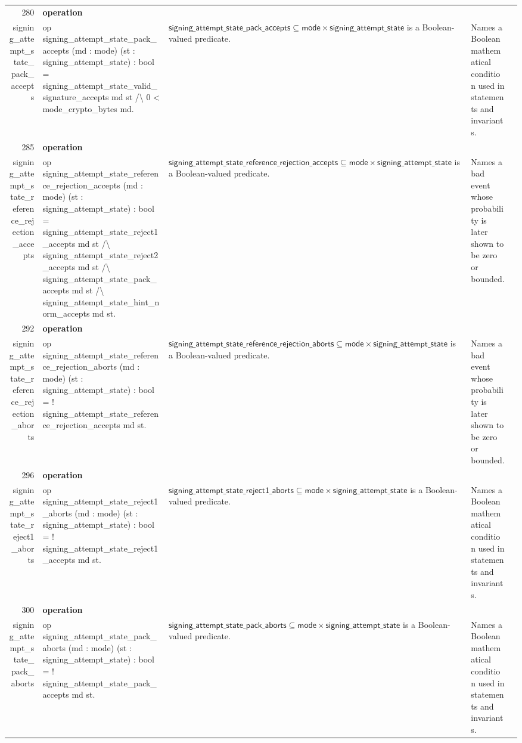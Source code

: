 \documentclass[10pt]{article}
\newcommand{\ec}[1]{\begingroup\ttfamily\scriptsize #1\endgroup}
\begin{document}
\begin{longtable}{r L{0.17\textwidth} L{0.26\textwidth} L{0.27\textwidth} L{0.20\textwidth}}
280 & \textbf{operation}\\\ec{signing\_attempt\_state\_pack\_accepts} & \ec{op signing\_attempt\_state\_pack\_accepts (md : mode) (st : signing\_attempt\_state) : bool = signing\_attempt\_state\_valid\_signature\_accepts md st /\textbackslash{} 0 < mode\_crypto\_bytes md.} & \(\mathsf{signing\_attempt\_state\_pack\_accepts} \subseteq \mathsf{mode} \times \mathsf{signing\_attempt\_state}\) is a Boolean-valued predicate. & Names a Boolean mathematical condition used in statements and invariants. \\
285 & \textbf{operation}\\\ec{signing\_attempt\_state\_reference\_rejection\_accepts} & \ec{op signing\_attempt\_state\_reference\_rejection\_accepts (md : mode) (st : signing\_attempt\_state) : bool = signing\_attempt\_state\_reject1\_accepts md st /\textbackslash{} signing\_attempt\_state\_reject2\_accepts md st /\textbackslash{} signing\_attempt\_state\_pack\_accepts md st /\textbackslash{} signing\_attempt\_state\_hint\_norm\_accepts md st.} & \(\mathsf{signing\_attempt\_state\_reference\_rejection\_accepts} \subseteq \mathsf{mode} \times \mathsf{signing\_attempt\_state}\) is a Boolean-valued predicate. & Names a bad event whose probability is later shown to be zero or bounded. \\
292 & \textbf{operation}\\\ec{signing\_attempt\_state\_reference\_rejection\_aborts} & \ec{op signing\_attempt\_state\_reference\_rejection\_aborts (md : mode) (st : signing\_attempt\_state) : bool = ! signing\_attempt\_state\_reference\_rejection\_accepts md st.} & \(\mathsf{signing\_attempt\_state\_reference\_rejection\_aborts} \subseteq \mathsf{mode} \times \mathsf{signing\_attempt\_state}\) is a Boolean-valued predicate. & Names a bad event whose probability is later shown to be zero or bounded. \\
296 & \textbf{operation}\\\ec{signing\_attempt\_state\_reject1\_aborts} & \ec{op signing\_attempt\_state\_reject1\_aborts (md : mode) (st : signing\_attempt\_state) : bool = ! signing\_attempt\_state\_reject1\_accepts md st.} & \(\mathsf{signing\_attempt\_state\_reject1\_aborts} \subseteq \mathsf{mode} \times \mathsf{signing\_attempt\_state}\) is a Boolean-valued predicate. & Names a Boolean mathematical condition used in statements and invariants. \\
300 & \textbf{operation}\\\ec{signing\_attempt\_state\_pack\_aborts} & \ec{op signing\_attempt\_state\_pack\_aborts (md : mode) (st : signing\_attempt\_state) : bool = ! signing\_attempt\_state\_pack\_accepts md st.} & \(\mathsf{signing\_attempt\_state\_pack\_aborts} \subseteq \mathsf{mode} \times \mathsf{signing\_attempt\_state}\) is a Boolean-valued predicate. & Names a Boolean mathematical condition used in statements and invariants. \\

\end{longtable}
\end{document}
